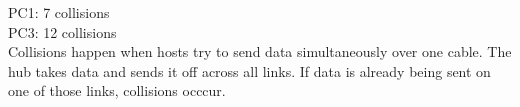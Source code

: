 PC1: 7 collisions \\
PC3: 12 collisions \\

Collisions happen when hosts try to send data simultaneously over one cable.
The hub takes data and sends it off across all links.
If data is already being sent on one of those links, collisions occcur.
